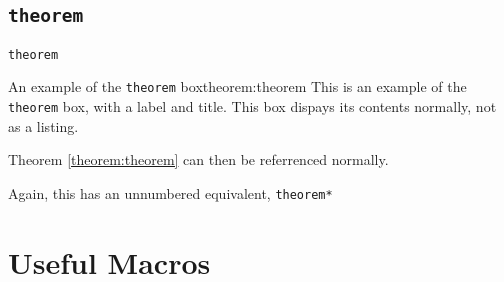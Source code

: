 \documentclass{article}
\begin{document}
\subsection*{\texttt{theorem}}
\begin{exampleCompiled*}{\texttt{theorem}}
\begin{theorem}{An example of the \texttt{theorem} box}{theorem:theorem}
This is an example of the \texttt{theorem} box, with a label and title. This box dispays its contents normally, not as a listing.
\end{theorem}
Theorem \ref{theorem:theorem} can then be referrenced normally.
\end{exampleCompiled*}

Again, this has an unnumbered equivalent, \lstinline|theorem*|
\clearpage

\section{Useful Macros}
\end{document}

